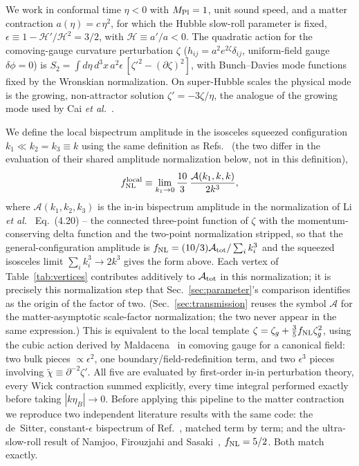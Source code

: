 \documentclass[aps,prd,twocolumn,superscriptaddress,nofootinbib,longbibliography]{revtex4-2}
\newcommand{\fnl}{f_{\rm NL}}
\begin{document}
We work in conformal time $\eta<0$ with $M_{\rm Pl}=1$, unit sound speed, and a
matter contraction $a(\eta)=c\,\eta^2$, for which the Hubble slow-roll parameter
is fixed, $\epsilon\equiv1-\mathcal H'/\mathcal H^2=3/2$, with
$\mathcal H\equiv a'/a<0$. The quadratic action for the comoving-gauge curvature
perturbation $\zeta$ ($h_{ij}=a^2e^{2\zeta}\delta_{ij}$, uniform-field gauge
$\delta\phi=0$) is $S_2=\int d\eta\,d^3x\,a^2\epsilon\,[\zeta'^2-(\partial\zeta)^2]$,
with Bunch--Davies mode functions fixed by the Wronskian normalization. On
super-Hubble scales the physical mode is the growing, non-attractor solution
$\zeta'=-3\zeta/\eta$, the analogue of the growing mode used by
Cai \textit{et al.}~\cite{Cai2009}.

We define the local bispectrum amplitude in the isosceles squeezed configuration
$k_1\ll k_2=k_3\equiv k$ using the same definition as Refs.~\cite{Cai2009,Li2016} (the two differ in
the evaluation of their shared amplitude normalization below, not in this
definition),
\begin{equation}
f_{\rm NL}^{\rm local}\equiv\lim_{k_1\to0}\frac{10}{3}\,\frac{\mathcal A(k_1,k,k)}{2k^3},
\end{equation}
where $\mathcal A(k_1,k_2,k_3)$ is the in-in bispectrum amplitude in the
normalization of Li \textit{et al.}~\cite{Li2016} Eq.~(4.20) -- the
connected three-point function of $\zeta$ with the momentum-conserving
delta function and the two-point normalization stripped, so that the
general-configuration amplitude is $\fnl=(10/3)\mathcal A_{\rm
tot}/\sum_ik_i^3$ and the squeezed isosceles limit
$\sum_ik_i^3\to2k^3$ gives the form above. Each vertex of
Table~\ref{tab:vertices} contributes additively to $\mathcal A_{\rm tot}$
in this normalization; it is precisely this normalization step that
Sec.~\ref{sec:parameter}'s comparison identifies as the origin of the
factor of two.
(Sec.~\ref{sec:transmission} reuses the symbol $\mathcal A$ for the
matter-asymptotic scale-factor normalization; the two never appear in the
same expression.) This is
equivalent to the local template $\zeta=\zeta_g+\tfrac35\fnl\zeta_g^2$, using the
cubic action derived by Maldacena~\cite{Maldacena2002} in comoving gauge for a
canonical field: two bulk pieces $\propto\epsilon^2$, one boundary/field-redefinition
term, and two $\epsilon^3$ pieces involving $\tilde\chi\equiv\partial^{-2}\zeta'$. All
five are evaluated by first-order in-in perturbation theory, every Wick contraction
summed explicitly, every time integral performed exactly before taking
$|k\eta_B|\to0$. Before applying this pipeline to the matter contraction we
reproduce two independent literature results with the same code: the de~Sitter,
constant-$\epsilon$ bispectrum of Ref.~\cite{Maldacena2002}, matched term by term;
and the ultra-slow-roll result of Namjoo, Firouzjahi and
Sasaki~\cite{Namjoo2012}, $f_{\rm NL}=5/2$. Both match exactly.
\end{document}
